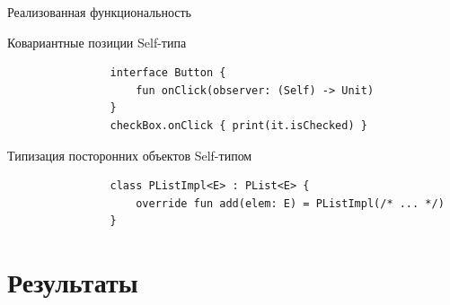 \documentclass[usenames, dvipsnames]{beamer}
\begin{document}
    \begin{frame}[fragile]{Реализованная функциональность}

        \begin{block}{Ковариантные позиции Self-типа}
            \begin{verbatim}
                interface Button {
                    fun onClick(observer: (Self) -> Unit)
                }
                checkBox.onClick { print(it.isChecked) }
            \end{verbatim}
        \end{block}
        \begin{block}{Типизация посторонних объектов Self-типом}
            \begin{verbatim}
                class PListImpl<E> : PList<E> {
                    override fun add(elem: E) = PListImpl(/* ... */)
                }
            \end{verbatim}
        \end{block}
    \end{frame}


    \section{Результаты}
\end{document}
